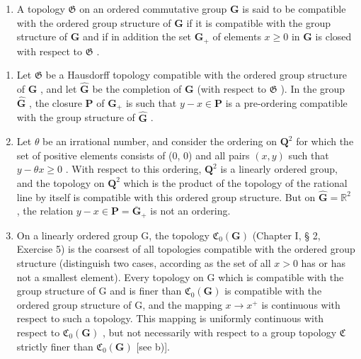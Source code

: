 \BourbakiExerciseGroup

\begin{enumerate}
\def\labelenumi{\arabic{enumi})}
\tightlist
\item
  A topology \(\mathfrak{G}\) on an ordered commutative group \(\mathbf{G}\) is said to be compatible with the ordered group structure of \(\mathbf{G}\) if it is compatible with the group structure of \(\mathbf{G}\) and if in addition the set \(\mathbf{G}_{+}\) of elements \(x \geqslant 0\) in \(\mathbf{G}\) is closed with respect to \(\mathfrak{G}\) .
\end{enumerate}

\begin{enumerate}
\def\labelenumi{\alph{enumi})}
\item
  Let \(\mathfrak{G}\) be a Hausdorff topology compatible with the ordered group structure of \(\mathbf{G}\) , and let \(\hat{\mathbf{G}}\) be the completion of \(\mathbf{G}\) (with respect to \(\mathfrak{G}\) ). In the group \(\hat{\mathbf{G}}\) , the closure \(\mathbf{P}\) of \(\mathbf{G}_{+}\) is such that \(y - x \in \mathbf{P}\) is a pre-ordering compatible with the group structure of \(\hat{\mathbf{G}}\) .
\item
  Let \(\theta\) be an irrational number, and consider the ordering on \(\mathbf{Q}^2\) for which the set of positive elements consists of (0, 0) and all pairs \((x, y)\) such that \(y - \theta x \geqslant 0\) . With respect to this ordering, \(\mathbf{Q}^2\) is a linearly ordered group, and the topology on \(\mathbf{Q}^2\) which is the product of the topology of the rational line by itself is compatible with this ordered group structure. But on \(\hat{\mathbf{G}} = \mathbb{R}^2\) , the relation \(y - x \in \mathbf{P} = \overline{\mathbf{G}}_+\) is not an ordering.
\item
  On a linearly ordered group G, the topology \(\mathfrak{C}_{0}(\mathbf{G})\) (Chapter I, § 2, Exercise 5) is the coarsest of all topologies compatible with the ordered group structure (distinguish two cases, according as the set of all \(x > 0\) has or has not a smallest element). Every topology on G which is compatible with the group structure of G and is finer than \(\mathfrak{C}_{0}(\mathbf{G})\) is compatible with the ordered group structure of G, and the mapping \(x \to x^{+}\) is continuous with respect to such a topology. This mapping is uniformly continuous with respect to \(\mathfrak{C}_{0}(\mathbf{G})\) , but not necessarily with respect to a group topology \(\mathfrak{C}\) strictly finer than \(\mathfrak{C}_{0}(\mathbf{G})\) {[}see b){]}.
\end{enumerate}

